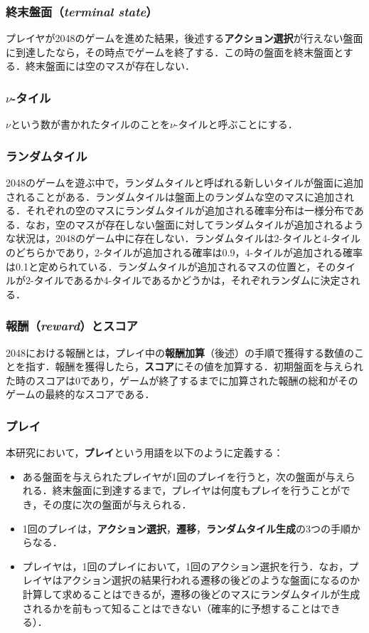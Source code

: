 \documentclass{suribt}
\begin{document}
\subsubsection{終末盤面（\textit{terminal state}）}
プレイヤが2048のゲームを進めた結果，後述する\textbf{アクション選択}が行えない盤面に到達したなら，その時点でゲームを終了する．この時の盤面を終末盤面とする．終末盤面には空のマスが存在しない．

\subsubsection{${\nu}$-タイル}
${\nu}$という数が書かれたタイルのことを${\nu}$-タイルと呼ぶことにする．

\subsubsection{ランダムタイル}
2048のゲームを遊ぶ中で，ランダムタイルと呼ばれる新しいタイルが盤面に追加されることがある．ランダムタイルは盤面上のランダムな空のマスに追加される．それぞれの空のマスにランダムタイルが追加される確率分布は一様分布である．なお，空のマスが存在しない盤面に対してランダムタイルが追加されるような状況は，2048のゲーム中に存在しない．ランダムタイルは2-タイルと4-タイルのどちらかであり，2-タイルが追加される確率は0.9，4-タイルが追加される確率は0.1と定められている．ランダムタイルが追加されるマスの位置と，そのタイルが2-タイルであるか4-タイルであるかどうかは，それぞれランダムに決定される．

\subsubsection{報酬（\textit{reward}）とスコア}
2048における報酬とは，プレイ中の\textbf{報酬加算}（後述）の手順で獲得する数値のことを指す．報酬を獲得したら，\textbf{スコア}にその値を加算する．初期盤面を与えられた時のスコアは0であり，ゲームが終了するまでに加算された報酬の総和がそのゲームの最終的なスコアである．

\subsubsection{プレイ}
本研究において，\textbf{プレイ}という用語を以下のように定義する：
\begin{itemize}
\item ある盤面を与えられたプレイヤが1回のプレイを行うと，次の盤面が与えられる．終末盤面に到達するまで，プレイヤは何度もプレイを行うことができ，その度に次の盤面が与えられる．
\item 1回のプレイは，\textbf{アクション選択}，\textbf{遷移}，\textbf{ランダムタイル生成}の3つの手順からなる．
\item プレイヤは，1回のプレイにおいて，1回のアクション選択を行う．なお，プレイヤはアクション選択の結果行われる遷移の後どのような盤面になるのか計算して求めることはできるが，遷移の後どのマスにランダムタイルが生成されるかを前もって知ることはできない（確率的に予想することはできる）．
\end{itemize}
\end{document}
